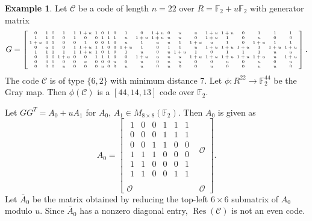 \documentclass{article}
\theoremstyle{definition}
\newtheorem{example}{Example}[section]
\theoremstyle{remark}
\begin{document}
\begin{example}\label{even-case2}
    Let $\mathcal{C}$ be a code of length $n=22$ over $R=\mathbb{F}_2+u\mathbb{F}_2$ with generator matrix
    \[
    \begingroup
    \setlength{\arraycolsep}{2pt}
    \tiny
    G=
    \left[
    \begin{array}{cccccccccccccccccccccc}
    0&1&0&1&1&1+u&1&0&1&0&1&0&1+u&0&u&u&1+u&1+u&0&1&1&1\\
    1&1&0&0&1&0&0&1&1&1&u&1+u&1+u&u&u&0&1+u&1&0&u&0&0\\
    1+u&0&1&0&0&1&0&0&1&0&u&1&u&u&1&1+u&u&1&0&1+u&1&1\\
    0&u&0&0&1&1+u&1&1&0&0&1+u&1&0&1&1&u&1+u&1+u&1+u&1&1+u&1+u\\
    1&1&1&1&1&1+u&1&0&1&0&1&u&0&u&1+u&1&0&1&1&1&u&u\\
    0&0&0&1+u&0&0&1&1&1&0&0&1+u&u&u&u&1+u&1+u&1+u&1+u&1+u&u&1+u\\
    0&0&0&0&0&u&0&0&0&u&0&u&0&u&u&0&0&u&0&u&0&u\\
    0&0&0&u&0&0&0&u&0&0&u&u&0&u&0&0&u&0&0&u&u&0
    \end{array}
    \right].
    \endgroup
    \]
    The code $\mathcal{C}$ is of type $\{6, 2\}$ with minimum distance 7. Let $\phi:R^{22}\to \mathbb{F}_2^{44}$ be the Gray map. Then $\phi(\mathcal{C})$ is a $[44, 14, 13]$ code over $\mathbb{F}_2$.
    
    Let $GG^T=A_0+uA_1$ for $A_0,\,A_1\in M_{8\times 8}(\mathbb{F}_2)$. Then $A_0$ is given as
    \[
    A_0=\left[
    \begin{array}{c|c}
        \begin{matrix}
            1 & 0 & 0 & 1 & 1 & 1\\
            0 & 0 & 0 & 1 & 1 & 1\\
            0 & 0 & 1 & 1 & 0 & 0\\
            1 & 1 & 1 & 0 & 0 & 0\\
            1 & 1 & 0 & 0 & 0 & 1\\
            1 & 1 & 0 & 0 & 1 & 1\\
        \end{matrix} & \mathcal{O}\\\hline
        \mathcal{O} & \mathcal{O}
    \end{array}
    \right].
    \]
    Let $\bar{A}_0$ be the matrix obtained by reducing the top-left $6\times 6$ submatrix of $A_0$ modulo $u$. Since $\bar{A}_0$ has a nonzero diagonal entry, $\operatorname{Res}(\mathcal{C})$ is not an even code.
    

\end{example}
\end{document}

